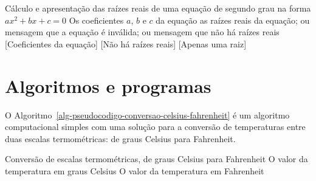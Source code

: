 \documentclass[
  11pt,
  a4paper,
]{scrbook}
\begin{document}
\begin{algorithm}
\caption{\label{alg-pseudocodigo-raizes-equacao}Pseudocódigo para o
cálculo e apresentação das raízes reais de uma equação de segundo grau.}
\begingroup%

\begin{algorithmic}
    \Description Cálculo e apresentação das raízes reais de uma equação de segundo grau na forma ${ax^2 + bx + c = 0}$
    \Require Os coeficientes $a$, $b$ e $c$ da equação
    \Ensure as raízes reais da equação; ou mensagem que a equação é inválida; ou mensagem que não há raízes reais
    \Statex{}
    [Coeficientes da equação]
    \Else
        [Não há raízes reais]
        [Apenas uma raiz]
        \EndIf
    \EndIf 
\end{algorithmic}

\endgroup
\end{algorithm}

\section{Algoritmos e programas}\label{algoritmos-e-programas}

O Algoritmo~\ref{alg-pseudocodigo-conversao-celsius-fahrenheit} é um
algoritmo computacional simples com uma solução para a conversão de
temperaturas entre duas escalas termométricas: de graus Celsius para
Fahrenheit.

\begin{algorithm}
\caption{\label{alg-pseudocodigo-conversao-celsius-fahrenheit}Conversão
de graus Celsius para Fahrenheit.}
\begingroup%

\begin{algorithmic}
    \Description Conversão de escalas termométricas, de graus Celsius para Fahrenheit
    \Require O valor da temperatura em graus Celsius
    \Ensure O valor da temperatura em Fahrenheit
    \Statex{}
\end{algorithmic}

\endgroup
\end{algorithm}
\end{document}
